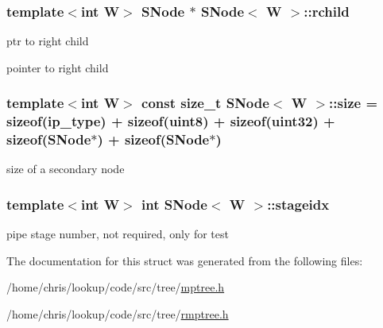 \hypertarget{structSNode_a215bae442818d32f7d03b6986e191285}{
\subsubsection[{rchild}]{\setlength{\rightskip}{0pt plus 5cm}template$<$int W$>$ {\bf S\-Node} $\ast$ {\bf S\-Node}$<$ {\bf W} $>$\-::rchild}}\label{structSNode_a215bae442818d32f7d03b6986e191285}


ptr to right child 

pointer to right child \hypertarget{structSNode_a4c70546fd8e93c27ca5318df8f8cab35}{
\subsubsection[{size}]{\setlength{\rightskip}{0pt plus 5cm}template$<$int W$>$ const size\-\_\-t {\bf S\-Node}$<$ {\bf W} $>$\-::size = sizeof({\bf ip\-\_\-type}) + sizeof({\bf uint8}) + sizeof({\bf uint32}) + sizeof({\bf S\-Node}$\ast$) + sizeof({\bf S\-Node}$\ast$)\hspace{0.3cm}{\ttfamily [static]}}}\label{structSNode_a4c70546fd8e93c27ca5318df8f8cab35}


size of a secondary node 

\hypertarget{structSNode_a7dc9daff31e9d8fb8b683942dadef134}{
\subsubsection[{stageidx}]{\setlength{\rightskip}{0pt plus 5cm}template$<$int W$>$ int {\bf S\-Node}$<$ {\bf W} $>$\-::stageidx}}\label{structSNode_a7dc9daff31e9d8fb8b683942dadef134}


pipe stage number, not required, only for test 



The documentation for this struct was generated from the following files\-:\begin{DoxyCompactItemize}
\item 
/home/chris/lookup/code/src/tree/\hyperlink{mptree_8h}{mptree.\-h}\item 
/home/chris/lookup/code/src/tree/\hyperlink{rmptree_8h}{rmptree.\-h}\end{DoxyCompactItemize}
